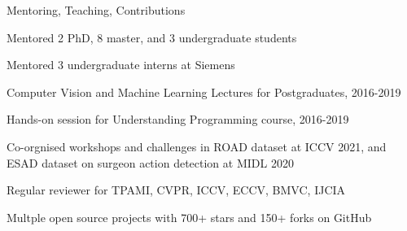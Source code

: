 \documentclass{resume} %
\begin{document}
\begin{paracol}{2}


\begin{rSection}{Mentoring, Teaching, Contributions}{} 
\begin{sSubsection}{Mentored 2 PhD, 8 master, and 3 undergraduate students} \end{sSubsection} %
\begin{sSubsection}{Mentored 3 undergraduate interns at Siemens}\end{sSubsection}
\begin{sSubsection}{Computer Vision and Machine Learning Lectures for Postgraduates, 2016-2019}\end{sSubsection}
\begin{sSubsection}{Hands-on session for Understanding Programming course, 2016-2019}\end{sSubsection}
\begin{sSubsection}{Co-orgnised workshops and challenges in ROAD dataset at ICCV 2021, and ESAD dataset on surgeon action detection at MIDL 2020}\end{sSubsection}
\begin{sSubsection}{Regular reviewer for TPAMI, CVPR, ICCV, ECCV, BMVC, IJCIA}\end{sSubsection}
\begin{sSubsection}{Multple open source projects with 700+ stars and 150+ forks on GitHub}\end{sSubsection}
\end{rSection}


\end{paracol}
\end{document}
